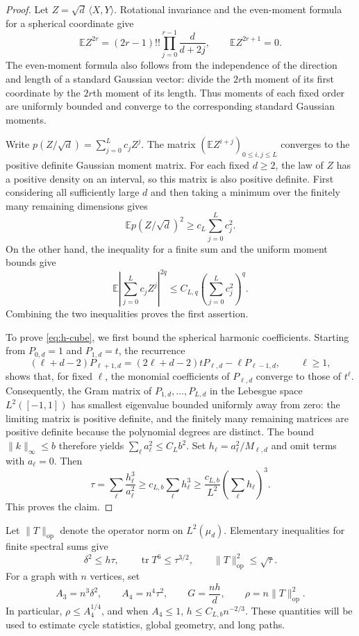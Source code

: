 \documentclass[11pt,reqno]{amsart}
\numberwithin{equation}{section}
\theoremstyle{definition}
\theoremstyle{remark}
\theoremstyle{definition}
\DeclareMathOperator{\tr}{tr}
\begin{document}
\begin{proof}
Let $Z=\sqrt d\,\langle X,Y\rangle$. Rotational invariance and the even-moment formula for a spherical coordinate give
\[
 \mathbb E Z^{2r}=(2r-1)!!\prod_{j=0}^{r-1}\frac{d}{d+2j},
 \qquad \mathbb E Z^{2r+1}=0.
\]
The even-moment formula also follows from the independence of the direction and length of a standard Gaussian vector:
divide the $2r$th moment of its first coordinate by the $2r$th moment of its length.
Thus moments of each fixed order are uniformly bounded and converge to the corresponding standard Gaussian moments.

Write $p(Z/\sqrt d)=\sum_{j=0}^L c_jZ^j$.
The matrix $(\mathbb E Z^{i+j})_{0\le i,j\le L}$ converges to the positive definite Gaussian moment matrix.
For each fixed $d\ge2$, the law of $Z$ has a positive density on an interval, so this matrix is also positive definite.
First considering all sufficiently large $d$ and then taking a minimum over the finitely many remaining dimensions gives
\[
 \mathbb E p(Z/\sqrt d)^2\ge c_L\sum_{j=0}^L c_j^2.
\]
On the other hand, the inequality for a finite sum and the uniform moment bounds give
\[
 \mathbb E\left|\sum_{j=0}^L c_jZ^j\right|^{2q}
 \le C_{L,q}\left(\sum_{j=0}^Lc_j^2\right)^q.
\]
Combining the two inequalities proves the first assertion.

To prove \eqref{eq:h-cube}, we first bound the spherical harmonic coefficients.
Starting from $P_{0,d}=1$ and $P_{1,d}=t$, the recurrence
\[
 (\ell+d-2)P_{\ell+1,d}
  =(2\ell+d-2)tP_{\ell,d}-\ell P_{\ell-1,d},
 \qquad \ell\ge1,
\]
shows that, for fixed $\ell$, the monomial coefficients of $P_{\ell,d}$ converge to those of $t^\ell$.
Consequently, the Gram matrix of $P_{1,d},\ldots,P_{L,d}$ in the Lebesgue space
$L^2([-1,1])$ has smallest eigenvalue bounded uniformly away from zero:
the limiting matrix is positive definite, and the finitely many remaining matrices are positive definite because the polynomial degrees are distinct.
The bound $\|k\|_\infty\le b$ therefore yields $\sum_\ell a_\ell^2\le C_Lb^2$.
Set $h_\ell=a_\ell^2/M_{\ell,d}$ and omit terms with $a_\ell=0$. Then
\[
 \tau=\sum_\ell\frac{h_\ell^3}{a_\ell^2}
 \ge c_{L,b}\sum_\ell h_\ell^3
 \ge \frac{c_{L,b}}{L^2}\left(\sum_\ell h_\ell\right)^3.
\]
This proves the claim.
\end{proof}

Let $\|T\|_{\mathrm{op}}$ denote the operator norm on $L^2(\mu_d)$.
Elementary inequalities for finite spectral sums give
\begin{equation}\label{eq:spectral-basic}
 \delta^2\le h\tau,\qquad
 \tr T^6\le\tau^{3/2},\qquad
 \|T\|_{\mathrm{op}}^2\le\sqrt\tau.
\end{equation}
For a graph with $n$ vertices, set
\begin{equation}\label{eq:signals}
 A_3=n^3\delta^2,\qquad A_4=n^4\tau^2,\qquad G=\frac{nh}{d},
 \qquad \rho=n\|T\|_{\mathrm{op}}^2.
\end{equation}
In particular, $\rho\le A_4^{1/4}$, and when $A_4\le1$,
$h\le C_{L,b}n^{-2/3}$.
These quantities will be used to estimate cycle statistics, global geometry, and long paths.
\end{document}
